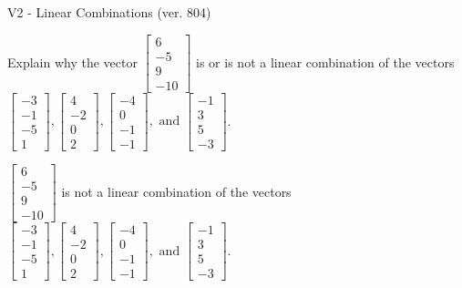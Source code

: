 \begin{exercise}
  \begin{exerciseTitle}V2 - Linear Combinations (ver. 804)\end{exerciseTitle}
  \begin{exerciseStatement}
    Explain why the vector \(\left[\begin{array}{c}
6 \\
-5 \\
9 \\
-10
\end{array}\right]\)  is or is not a linear 
	combination of the vectors \(\left[\begin{array}{c}
-3 \\
-1 \\
-5 \\
1
\end{array}\right] , \left[\begin{array}{c}
4 \\
-2 \\
0 \\
2
\end{array}\right] , \left[\begin{array}{c}
-4 \\
0 \\
-1 \\
-1
\end{array}\right] , \text{ and } \left[\begin{array}{c}
-1 \\
3 \\
5 \\
-3
\end{array}\right]\).
	


  \end{exerciseStatement}
  \begin{exerciseAnswer}
   \(\left[\begin{array}{c}
6 \\
-5 \\
9 \\
-10
\end{array}\right]\) 
  	 is not  
	a linear combination of the vectors \(\left[\begin{array}{c}
-3 \\
-1 \\
-5 \\
1
\end{array}\right] , \left[\begin{array}{c}
4 \\
-2 \\
0 \\
2
\end{array}\right] , \left[\begin{array}{c}
-4 \\
0 \\
-1 \\
-1
\end{array}\right] , \text{ and } \left[\begin{array}{c}
-1 \\
3 \\
5 \\
-3
\end{array}\right]\).


\end{exerciseAnswer}
\end{exercise}
